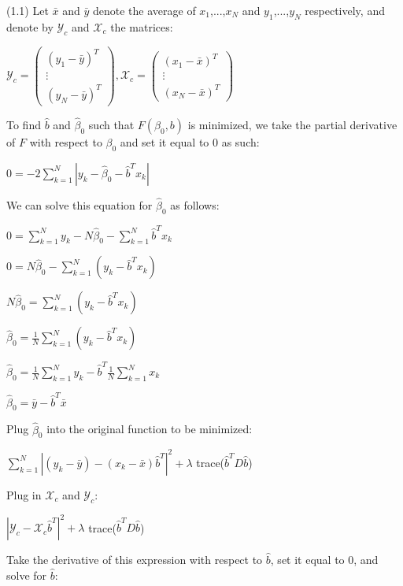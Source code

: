 (1.1) Let $\bar{x}$ and $\bar{y}$ denote the average of $x_{1}$,...,$x_{N}$ and $y_{1}$,...,$y_{N}$ respectively, and denote by $\mathcal{Y}_{c}$ and $\mathcal{X}_{c}$ the matrices:
\begin{center}
$\mathcal{Y}_{c} = 
\begin{pmatrix}
(y_{1} - \bar{y})^{T} \\
\vdots \\
(y_{N} - \bar{y})^{T}
\end{pmatrix}
,
\mathcal{X}_{c} = 
\begin{pmatrix}
(x_{1} - \bar{x})^{T} \\
\vdots \\
(x_{N} - \bar{x})^{T}
\end{pmatrix}$
\end{center}
To find $\hat{b}$ and $\hat{\beta}_{0}$ such that $F(\beta_{0}, b)$ is minimized, we take the partial derivative of $F$ with respect to $\beta_{0}$ and set it equal to 0 as such:
\begin{center}
    $0 = -2\sum\limits_{k=1}^N|y_{k} - \hat{\beta}_{0} - \hat{b}^{T}x_{k}|$
\end{center}
We can solve this equation for $\hat{\beta}_{0}$ as follows:
\begin{center}
    $0 = \sum\limits_{k=1}^N y_{k} - N\hat{\beta}_{0} - \sum\limits_{k=1}^N \hat{b}^{T}x_{k}$

    $0 = N\hat{\beta}_{0} - \sum\limits_{k=1}^N (y_{k} - \hat{b}^{T}x_{k})$

    $N\hat{\beta}_{0} = \sum\limits_{k=1}^N (y_{k} - \hat{b}^{T}x_{k})$

    $\hat{\beta}_{0} = \frac{1}{N}\sum\limits_{k=1}^N (y_{k} - \hat{b}^{T}x_{k})$

    $\hat{\beta}_{0} = \frac{1}{N}\sum\limits_{k=1}^N y_{k} - \hat{b}^{T} \frac{1}{N}\sum\limits_{k=1}^N x_{k}$

    $\hat{\beta}_{0} = \bar{y} - \hat{b}^{T}\bar{x}$
\end{center}
Plug $\hat{\beta}_{0}$ into the original function to be minimized:
\begin{center}
    $\sum\limits_{k=1}^N|(y_{k} - \bar{y}) - (x_{k} - \bar{x})\hat{b}^{T}|^{2} + \lambda$ trace($\hat{b}^{T}D\hat{b}$)
\end{center}
Plug in $\mathcal{X}_{c}$ and $\mathcal{Y}_{c}$:
\begin{center}
    $|\mathcal{Y}_{c} - \mathcal{X}_{c}\hat{b}^{T}|^{2} + \lambda$ trace($\hat{b}^{T}D\hat{b}$)
\end{center}
Take the derivative of this expression with respect to $\hat{b}$, set it equal to 0, and solve for $\hat{b}$:
